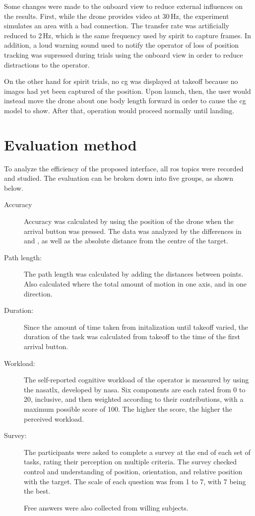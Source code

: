 Some changes were made to the onboard view to reduce external influences on the results.  
First, while the drone provides video at 30\,Hz, the experiment simulates an area with a bad connection.
The transfer rate was artificially reduced to 2\,Hz, which is the same frequency used by \gls{spirit} to capture frames.
In addition, a loud warning sound used to notify the operator of loss of position tracking was supressed during trials using the onboard view in order to reduce distractions to the operator.

On the other hand for \gls{spirit} trials, no \gls{cg} was displayed at takeoff because no images had yet been captured of the position.
Upon launch, then, the user would instead move the drone about one body length forward in order to cause the \gls{cg} model to show.
After that, operation would proceed normally until landing.

\section{Evaluation method}
  \label{sec:experiment_eval}
  To analyze the efficiency of the proposed interface, all \gls{ros} topics were recorded and studied.
  The evaluation can be broken down into five groups, as shown below.

  \begin{description}
    \item[Accuracy]
      Accuracy was calculated by using the position of the drone when the arrival button was pressed.
      The data was analyzed by the differences in  and , as well as the absolute distance from the centre of the target.
    \item[Path length:]
      The path length was calculated by adding the distances between points. Also calculated where the total amount of motion in one axis, and in one direction.
    \item[Duration:]
      Since the amount of time taken from initalization until takeoff varied, the duration of the task was calculated from takeoff to the time of the first arrival button.
    \item[Workload:]
      The self-reported cognitive workload of the operator is measured by using the \gls{nasatlx}, developed by \gls{nasa}. %
      Six components are each rated from 0 to 20, inclusive, and then weighted according to their contributions, with a maximum possible score of 100.
      The higher the score, the higher the perceived workload.
    \item[Survey:]
      The participants were asked to complete a survey at the end of each set of tasks, rating their perception on multiple criteria.
      The survey checked control and understanding of position, orientation, and relative position with the target.
      The scale of each question was from 1 to 7, with 7 being the best.

      Free answers were also collected from willing subjects.
  \end{description}

